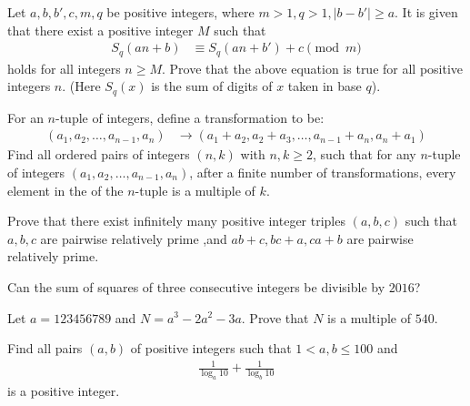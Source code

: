 \begin{problem}
	Let $a,b,b',c,m,q$ be positive integers, where $m>1,q>1,|b-b'|\ge a$. It is given that there exist a positive integer $M$ such that
		\begin{align*}
			S_q(an+b)
				& \equiv S_q(an+b')+c\pmod{m}
		\end{align*}
	holds for all integers $n\ge M$. Prove that the above equation is true for all positive integers $n$. (Here $S_q(x)$ is the sum of digits of $x$ taken in base $q$). %
\end{problem}

\begin{problem}
	For an $n$-tuple of integers, define a transformation to be:
		\begin{align*}
			(a_1,a_2,\dots,a_{n-1},a_n)
				& \rightarrow (a_1+a_2, a_2+a_3, \dots, a_{n-1}+a_n, a_n+a_1)
		\end{align*}
	Find all ordered pairs of integers $(n,k)$ with $n,k\geq 2$, such that for any $n$-tuple of integers $(a_1,a_2,\dots,a_{n-1},a_n)$, after a finite number of transformations, every element in the of the $n$-tuple is a multiple of $k$. %
\end{problem}

\begin{problem}
	Prove that there exist infinitely many positive integer triples $(a,b,c)$ such that $a ,b,c$ are pairwise relatively prime ,and $ab+c ,bc+a ,ca+b$ are pairwise relatively prime. %
\end{problem}

\begin{problem}
	Can the sum of squares of three consecutive integers be divisible by $2016$?
\end{problem}

\begin{problem}
	Let $a = 123456789$ and $N = a^3 - 2a^2 - 3a$. Prove that $N$ is a multiple of $540$.
\end{problem}

\begin{problem}
	Find all pairs $(a, b)$ of positive integers such that $1 < a, b \leq 100$ and
	\begin{align*}
		\frac{1}{\log_a 10} + \frac{1}{\log_b 10}
	\end{align*}
	is a positive integer.
\end{problem}

